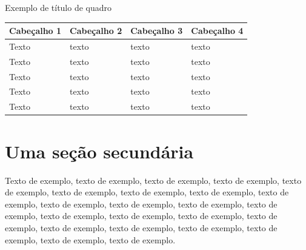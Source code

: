 \documentclass[
	12pt,				%
	oneside,			%
	a4paper,			%
	english,			%
	brazil				%
	]{abntex2ppgsi}
\begin{document}
% 
%
%
%
%
\begin{quadro}[H]
	\centering
	\caption{Exemplo de título de quadro}
	\begin{tabular}{|p{1in} | p{1in} | p{1in} | p{1in} |} \hline
		
		Cabeçalho 1	& Cabeçalho 2	& Cabeçalho 3	& Cabeçalho 4 \\ \hline
		Texto	& texto & texto	& texto \\ \hline
		Texto	& texto & texto	& texto \\ \hline
		Texto	& texto & texto	& texto \\ \hline
		Texto	& texto & texto	& texto \\ \hline
		Texto	& texto & texto	& texto \\ \hline
		
	\end{tabular}
	\label{qua:ExemploDeQuadro1}
\end{quadro}


\section{Uma seção secundária}
 
Texto de exemplo, texto de exemplo, texto de exemplo, texto de exemplo, texto de exemplo, texto de exemplo, texto de exemplo, texto de exemplo, texto de exemplo, texto de exemplo, texto de exemplo, texto de exemplo, texto de exemplo, texto de exemplo, texto de exemplo, texto de exemplo, texto de exemplo, texto de exemplo, texto de exemplo, texto de exemplo, texto de exemplo, texto de exemplo, texto de exemplo.
\end{document}
